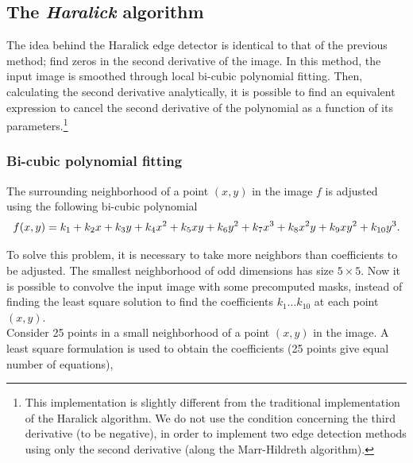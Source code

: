 \documentclass{ipol}
\numberwithin{equation}{section}
\numberwithin{table}{section}
\numberwithin{figure}{section}
\begin{document}

\subsection{The \textit{Haralick} algorithm}

The idea behind the Haralick edge detector is identical to that of the previous method; find zeros in 
the second derivative of the image. In this method, the input image is smoothed through local bi-cubic
polynomial fitting. Then, calculating the second derivative analytically, it is possible to find an equivalent expression to cancel the second derivative of the polynomial as a function of its parameters.\footnote{This implementation is slightly 
different from the traditional implementation of the Haralick algorithm. We do not use the condition concerning the third derivative (to be negative), in order to implement two edge detection methods using only the second derivative (along the Marr-Hildreth algorithm).}


\subsubsection{Bi-cubic polynomial fitting}
\label{sec:bicubic}

The surrounding neighborhood of a point $(x,y)$ in the image $f$ is adjusted using the following bi-cubic polynomial
\begin{equation}
	\label{eq:bicubic}
	f(x,y) = k_1 + k_2x + k_3y + k_4x^2 + k_5xy + k_6y^2 + k_7x^3 + k_8x^2y + k_9xy^2 + k_{10}y^3.\\
\end{equation}

To solve this problem, it is necessary to take more neighbors than coefficients to be adjusted. The smallest 
neighborhood of odd dimensions has size $5\times5$. Now it is possible to convolve the input image
with some precomputed masks, instead of finding the least square solution to find the coefficients 
$k_1\dots k_{10}$ at each point $(x,y)$.\\

Consider 25 points in a small neighborhood of a point $(x,y)$ in the image. A least square
formulation is used to obtain the coefficients (25 points give equal number of equations),
\end{document}
